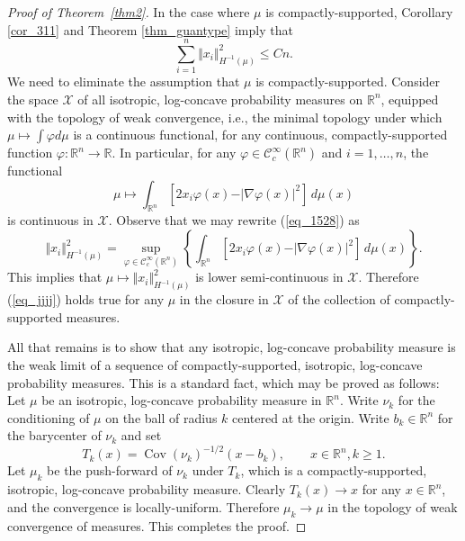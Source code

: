 \documentclass[12pt,a4paper]{article}
\newcommand{\RR}{\mathbb{R}}
\newcommand{\R}{\mathbb{R}}
\newcommand{\cov}{\mathop{\mathrm{Cov}}\nolimits}
\newcommand{\vphi}{\varphi}
\renewcommand{\phi}{\varphi}
\theoremstyle{definition}
\newcommand{\cX}{\mathcal{X}}
\begin{document}
\begin{proof}[Proof of Theorem~\ref{thm2}]
In the case where $\mu$ is compactly-supported, 
Corollary \ref{cor_311} and Theorem \ref{thm_guantype} imply that
\begin{equation}\label{eq_jjjj}
\sum_{i=1}^n \Vert x_i\Vert_{H^{-1} (\mu)}^2 \leq Cn.
\end{equation}
We need to eliminate the assumption that $\mu$ is compactly-supported.
Consider the space $\mathcal X$ of all isotropic, log-concave probability measures on $\RR^n$,
equipped with the topology of weak convergence, i.e.,  the minimal topology under which
$\mu \mapsto \int \vphi d \mu$ is a continuous functional, for any continuous, compactly-supported 
function $\vphi: \RR^n \rightarrow \RR$. In particular, for any 
$\vphi \in \mathcal C_c^{\infty}(\RR^n)$ and $i=1,\ldots,n$, the functional 
\[
\mu \mapsto \int_{\R^n} [ 2 x_i \phi (x) -  \vert \nabla \phi (x)\vert^2  ] \, d \mu (x)
\]
is continuous in $\cX$. Observe that we may rewrite  (\ref{eq_1528}) as 
\[
\Vert x_i\Vert^2_{H^{-1} (\mu)} =
\sup_{\phi \in \mathcal C^\infty_c (\R^n)}
\left\{ \int_{\R^n} [ 2 x_i \phi (x) -  \vert \nabla \phi (x)\vert^2    ] \, d \mu (x) \right\}.
\]
This implies that $\mu \mapsto \Vert x_i\Vert^2_{H^{-1} (\mu)}$ is lower semi-continuous in $\mathcal X$.
Therefore (\ref{eq_jjjj}) holds true for any $\mu$ in the closure in $\cX$ of  the collection 
of compactly-supported measures. 

\medskip All that remains is to show that any isotropic, log-concave probability measure 
is the weak limit of a sequence of compactly-supported, isotropic, log-concave probability measures. 
This is a standard fact, which may be proved as follows: Let $\mu$ be an isotropic, log-concave probability measure in $\RR^n$. Write $\nu_k$ for the conditioning of $\mu$ on the ball of radius $k$ centered at the origin.
Write $b_k \in \RR^n$ for the barycenter of $\nu_k$ and set $$ T_k(x) = \cov(\nu_k)^{-1/2}(x - b_k), \qquad x \in \RR^n, k \geq 1. $$
Let $\mu_k$ be the push-forward of $\nu_k$ under $T_k$, which is a compactly-supported, isotropic, log-concave probability measure.
Clearly  $T_k(x) \longrightarrow  x$ for any $x \in \RR^n$, and the convergence is locally-uniform. Therefore $\mu_k \longrightarrow  \mu$
in the topology of weak convergence of measures. This completes the proof.
\end{proof}
\end{document}
